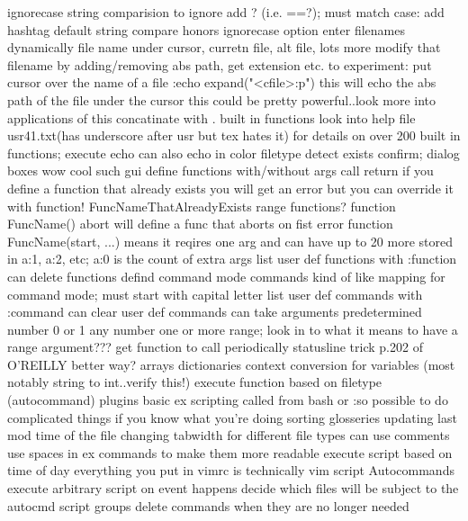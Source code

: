 \documentclass[12pt]{book}
\begin{document}
{{      ignorecase string comparision
        to ignore add ? (i.e. ==?); must match case: add hashtag
        default string compare honors ignorecase option
    enter filenames dynamically
      file name under cursor, curretn file, alt file, lots more
      modify that filename by adding/removing abs path, get extension etc.
      to experiment:
        put cursor over the name of a file
        :echo expand("<cfile>:p")
        this will echo the abs path of the file under the cursor
        this could be pretty powerful..look more into applications of this
    concatinate with .
    built in functions
      look into help file usr41.txt(has underscore after usr but tex hates it) for details on over 200 built in functions;
      execute
      echo
        can also echo in color
      filetype detect
      exists
      confirm; dialog boxes wow cool such gui
    define functions
      with/without args
      call
      return
      if you define a function that already exists you will get an error but you can override it with function! FuncNameThatAlreadyExists
      range functions?
      function FuncName() abort will define a func that aborts on fist error
      function FuncName(start, ...) means it reqires one arg and can have up to 20 more stored in a:1, a:2, etc; a:0 is the count of extra args
      list user def functions with :function
      can delete functions
    defind command mode commands
      kind of like mapping for command mode; must start with capital letter
      list user def commands with :command
      can clear user def commands
      can take arguments
        predetermined number
        0 or 1
        any number
        one or more
        range; look in to what it means to have a range argument???
    get function to call periodically
      statusline trick p.202 of O'REILLY
      better way?
    arrays
    dictionaries
    context conversion for variables (most notably string to int..verify this!)
    execute function based on filetype (autocommand)
    plugins
    basic ex scripting called from bash or :so
      possible to do complicated things if you know what you're doing
        sorting glosseries
        updating last mod time of the file
        changing tabwidth for different file types
      can use comments
      use spaces in ex commands to make them more readable
    execute script based on time of day
    everything you put in vimrc is technically vim script
    Autocommands
      execute arbitrary script on event happens
      decide which files will be subject to the autocmd script
      groups
      delete commands when they are no longer needed
}}
\end{document}
